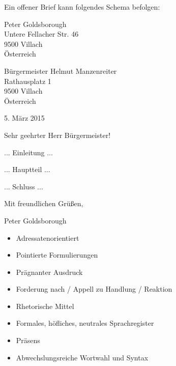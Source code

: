 
Ein offener Brief kann folgendes Schema befolgen:

{ \em

Peter Goldsborough\\
Untere Fellacher Str. 46\\
9500 Villach\\
\"{O}sterreich

B\"{u}rgermeister Helmut Manzenreiter\\
Rathausplatz 1\\
9500 Villach\\
\"{O}sterreich
\begin{flushright} 5. M\"{a}rz 2015 \end{flushright}
Sehr geehrter Herr B\"{u}rgermeister!

... Einleitung ...

... Hauptteil ...

... Schluss ...

Mit freundlichen Gr\"{u}\ss{}en,

Peter Goldsborough

} %

\extrapar


\begin{itemize}
	\item Adressatenorientiert
	\item Pointierte Formulierungen
	\item Pr\"{a}gnanter Ausdruck
	\item Forderung nach / Appell zu Handlung / Reaktion
	\item Rhetorische Mittel
	\item Formales, h\"{o}fliches, neutrales Sprachregister
	\item Pr\"{a}sens
	\item Abwechslungsreiche Wortwahl und Syntax
\end{itemize}

